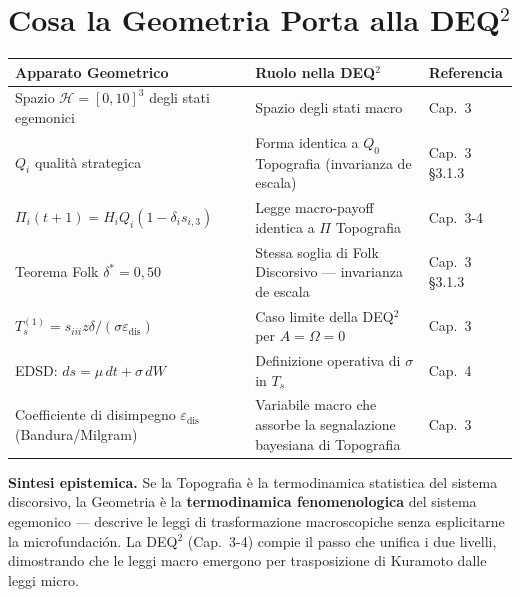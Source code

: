 \section{Cosa la Geometria Porta alla
DEQ$^2$}\label{cosa-la-geometria-porta-alla-dequxb2}

{\def\LTcaptype{none} %
{\small\begin{longtable}[]{@{}
  >{\raggedright\arraybackslash}p{}
  >{\raggedright\arraybackslash}p{}
  >{\raggedright\arraybackslash}p{}@{}}
\toprule\noalign{}
\begin{minipage}[b]{\linewidth}\raggedright
Apparato Geometrico
\end{minipage} & \begin{minipage}[b]{\linewidth}\raggedright
Ruolo nella DEQ$^2$
\end{minipage} & \begin{minipage}[b]{\linewidth}\raggedright
Referencia
\end{minipage} \\
\midrule\noalign{}
\endhead
\bottomrule\noalign{}
\endlastfoot
Spazio \(\mathcal{H} = [0,10]^3\) degli stati egemonici & Spazio degli
stati macro & Cap.~3 \\
\(Q_i\) qualità strategica & Forma identica a \(Q_0\) Topografia
(invarianza de escala) & Cap.~3 \S{}3.1.3 \\
\(\Pi_i(t+1) = H_i Q_i (1 - \delta_i s_{i,3})\) & Legge macro-payoff
identica a $\Pi$ Topografia & Cap.~3-4 \\
Teorema Folk \(\delta^* = 0{,}50\) & Stessa soglia di Folk Discorsivo
--- invarianza de escala & Cap.~3 \S{}3.1.3 \\
\(T_s^{(1)} = s_{iii} z \delta / (\sigma \varepsilon_{\text{dis}})\) &
Caso limite della DEQ$^2$ per \(A = \Omega = 0\) & Cap.~3 \\
EDSD: \(ds = \mu\, dt + \sigma\, dW\) & Definizione operativa di
\(\sigma\) in \(T_s\) & Cap.~4 \\
Coefficiente di disimpegno \(\varepsilon_{\text{dis}}\)
(Bandura/Milgram) & Variabile macro che assorbe la segnalazione
bayesiana di Topografia & Cap.~3 \\
\end{longtable}}
}

\Hypoth{} \textbf{Sintesi epistemica.} Se la Topografia è la
termodinamica statistica del sistema discorsivo, la Geometria è la
\textbf{termodinamica fenomenologica} del sistema egemonico --- descrive
le leggi di trasformazione macroscopiche senza esplicitarne la
microfundación. La DEQ$^2$ (Cap.~3-4) compie il passo che unifica i due
livelli, dimostrando che le leggi macro emergono per trasposizione di
Kuramoto dalle leggi micro.



